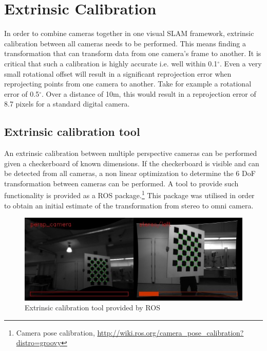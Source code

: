 \chapter{Extrinsic Calibration}
\label{chapter:extrinsic_calibration}

In order to combine cameras together in one visual SLAM framework, extrinsic calibration between all cameras needs to be performed.  This means finding a transformation that can transform data from one camera's frame to another.  It is critical that such a calibration is highly accurate i.e. well within 0.1$^{\circ}$.  Even a very small rotational offset will result in a significant reprojection error when reprojecting points from one camera to another.  Take for example a rotational error of 0.5$^{\circ}$.  Over a distance of 10m, this would result in a reprojection error of 8.7 pixels for a standard digital camera.

\section{Extrinsic calibration tool}
\label{sec:ros_tool}

An extrinsic calibration between multiple perspective cameras can be performed given a checkerboard of known dimensions.  If the checkerboard is visible and can be detected from all cameras, a non linear optimization to determine the 6 DoF transformation between cameras can be performed.  A tool to provide such functionality is provided as a ROS package.\footnote{Camera pose calibration, \url{http://wiki.ros.org/camera_pose_calibration?distro=groovy}}  This package was utilised in order to obtain an initial estimate of the transformation from stereo to omni camera.

\begin{figure}[h!]
  \centering
    \includegraphics[width=1.0\textwidth]{chapters/images/extrinsic_cal_1}
  \caption{Extrinsic calibration tool provided by ROS}
  \label{fig:extrinsic_cal_1}
\end{figure}

